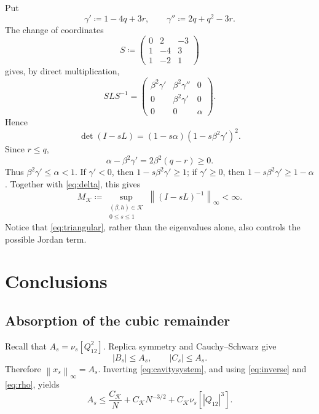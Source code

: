 \documentclass[11pt]{article}
\numberwithin{equation}{section}
\newcommand{\1}{\mathbf 1}
\newcommand{\cK}{\mathcal K}
\newcommand{\norm}[1]{\left\lVert #1\right\rVert}
\begin{document}
Put
\begin{equation}
 \gamma'\coloneqq1-4q+3r,\qquad
 \gamma''\coloneqq2q+q^2-3r.
 \label{eq:gammas}
\end{equation}
The change of coordinates
\[
 S\coloneqq
 \begin{pmatrix}
 0&2&-3\\
 1&-4&3\\
 1&-2&1
 \end{pmatrix}
\]
gives, by direct multiplication,
\begin{equation}
 SLS^{-1}
 =
 \begin{pmatrix}
 \beta^2\gamma'&\beta^2\gamma''&0\\
 0&\beta^2\gamma'&0\\
 0&0&\alpha
 \end{pmatrix}.
 \label{eq:triangular}
\end{equation}
Hence
\begin{equation}
 \det(I-sL)
 =(1-s\alpha)(1-s\beta^2\gamma')^2.
 \label{eq:det}
\end{equation}
Since $r\le q$,
\[
 \alpha-\beta^2\gamma'
 =2\beta^2(q-r)\ge0.
\]
Thus $\beta^2\gamma'\le\alpha<1$.  If $\gamma'<0$, then
$1-s\beta^2\gamma'\ge1$; if $\gamma'\ge0$, then
$1-s\beta^2\gamma'\ge1-\alpha$.  Together with
\eqref{eq:delta}, this gives
\begin{equation}
 M_{\cK}\coloneqq
 \sup_{\substack{(\beta,h)\in\cK\\0\le s\le1}}
 \norm{(I-sL)^{-1}}_\infty<\infty.
 \label{eq:inverse}
\end{equation}
Notice that \eqref{eq:triangular}, rather than the eigenvalues alone,
also controls the possible Jordan term.

\section{Conclusions}\label{sec:conclusion}
\subsection{Absorption of the cubic remainder}\label{subsec:absorb}

Recall that $A_s= \nu_s[Q_{12}^2]$. Replica symmetry and Cauchy--Schwarz give
\[
 |B_s|\le A_s,\qquad |C_s|\le A_s.
\]
Therefore $\norm{x_s}_\infty=A_s$.  Inverting
\eqref{eq:cavitysystem}, and using \eqref{eq:inverse} and
\eqref{eq:rho}, yields
\begin{equation}
 A_s
 \le \frac{C_{\cK}}N
 +C_{\cK}N^{-3/2}
 +C_{\cK}\nu_s[|Q_{12}|^3].
 \label{eq:preabsorb}
\end{equation}
\end{document}
